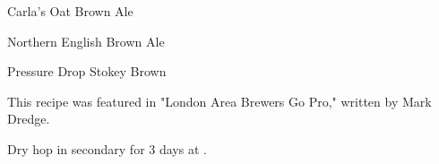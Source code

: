 \begin{recipe}{Carla's Oat Brown Ale}
\begin{recipe}{Northern English Brown Ale}
\begin{ingredientsblock}

\end{ingredientsblock}

\end{recipe}

\begin{recipe}{Pressure Drop Stokey Brown}

\begin{aboutblock}
This recipe was featured in "London Area Brewers Go Pro," written by Mark Dredge.
\end{aboutblock}


\begin{methodandtiming}

\begin{mashsteps}
\end{mashsteps}

\begin{directions}
Dry hop in secondary for 3 days at .
\end{directions}

\end{methodandtiming}

\recipebreak

\begin{ingredientsblock}

\begin{malts}
\end{malts}

\begin{hops}
\end{hops}


\end{ingredientsblock}
\end{recipe}
\end{recipe}
